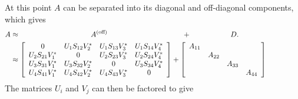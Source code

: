 \documentclass{sfuthesis}
\begin{document}
At this point $A$ can be separated into its diagonal and off-diagonal components, which gives 
\begin{align*}
	A&\approx \hspace{3.4cm}A^{(\text{off})} \hspace{3.6cm} + \hspace{1.9cm}D.\hspace{3cm}\\
         &\approx \left[\begin{array}{cccc}
	0 & U_1S_{12}V_2^* & U_1S_{13}V_3^* & U_1S_{14}V_4^*\\
	U_2 S_{21}V_1^* & 0 & U_2 S_{23} V_3^* & U_2 S_{24} V_4^*\\
	U_3 S_{31}V_1^* &U_3 S_{32} V_2^* & 0 & U_3 S_{34} V_4^*\\
	U_4 S_{41} V_1^* & U_4 S_{42} V_2^* & U_4 S_{43} V_3^* & 0
\end{array}\right] +  \left[\begin{array}{cccc}
	A_{11} & & & \\
 	& A_{22} &  & \\
 	& & A_{33} & \\
 	& &  & A_{44}
\end{array}\right]
\end{align*}
The matrices $U_i$ and $V_j$ can then be factored to give 
\end{document}
